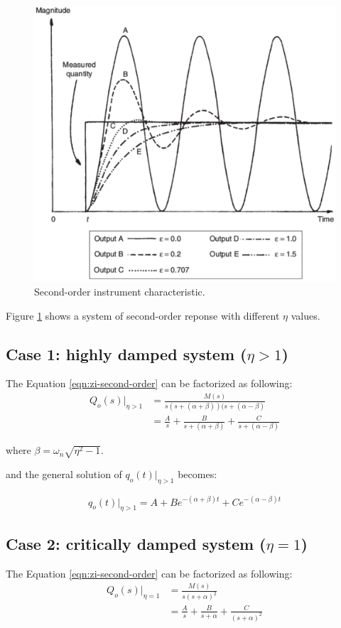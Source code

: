\documentclass[a4paper,11pt,dvipsnames]{book}
\begin{document}
\begin{figure}[h!]\label{fig:second-order}
\centering
  \includegraphics[width=0.7\linewidth]{second-order}
  \caption{Second-order instrument characteristic. } 
\end{figure}

Figure \ref{fig:second-order} shows a system of second-order reponse with different $\eta$ values.

\subsection*{Case 1: highly damped system ($\eta > 1$)}

The Equation \ref{eqn:zi-second-order} can be factorized as following:
\begin{align*}
Q_o(s)|_{\eta>1} &= \frac{M(s)}{s(s + (\alpha + \beta))(s + (\alpha - \beta)} \\
&= \frac{A}{s} + \frac{B}{s + (\alpha + \beta)} + \frac{C}{s + (\alpha - \beta)}
\end{align*}

where $\beta = \omega_n\sqrt{\eta^2 - 1}$.

and the general solution of $q_o(t)|_{\eta>1}$ becomes:

\begin{equation}
q_o(t)|_{\eta>1} = A + Be^{-(\alpha+\beta)t}+Ce^{-(\alpha-\beta)t}
\end{equation}

\subsection*{Case 2: critically damped system ($\eta = 1$)}

The Equation \ref{eqn:zi-second-order} can be factorized as following:
\begin{align*}
Q_o(s)|_{\eta=1} &= \frac{M(s)}{s(s +\alpha)^2} \\
&= \frac{A}{s} + \frac{B}{s + \alpha} + \frac{C}{(s + \alpha)^2}
\end{align*}
\end{document}

